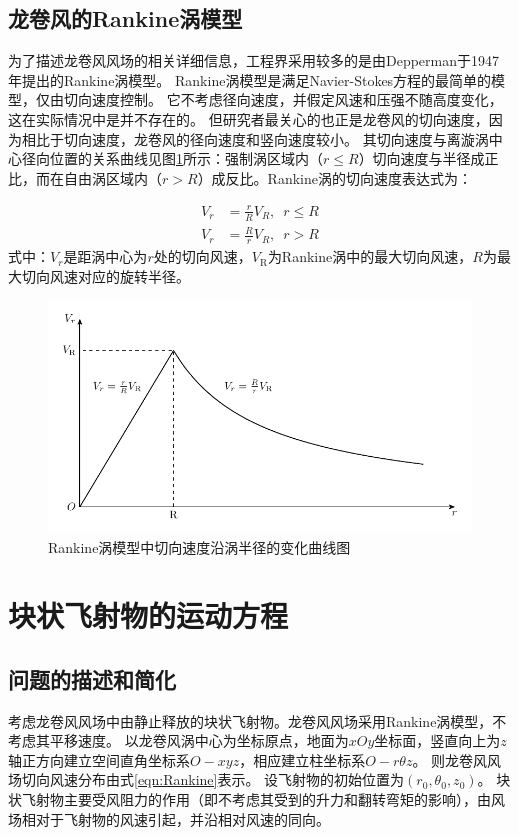 \documentclass{ctexart}
\begin{document}
\subsection{龙卷风的Rankine涡模型}
为了描述龙卷风风场的相关详细信息，工程界采用较多的是由Depperman\cite{Depperman1947}于1947年提出的Rankine涡模型。
Rankine涡模型是满足Navier-Stokes方程的最简单的模型，仅由切向速度控制。
它不考虑径向速度，并假定风速和压强不随高度变化，这在实际情况中是并不存在的。
但研究者最关心的也正是龙卷风的切向速度，因为相比于切向速度，龙卷风的径向速度和竖向速度较小。
其切向速度与离漩涡中心径向位置的关系曲线见图\ref{fig:Rankine}所示：强制涡区域内（$r\leq R$）切向速度与半径成正比，而在自由涡区域内（$r > R$）成反比。Rankine涡的切向速度表达式为\cite{Commission2007}：

\begin{equation}
\label{eqn:Rankine}
\begin{split}
    V_r &= \frac{r}{R} V_R,  \,\,\, r \leq R \\
    V_r &= \frac{R}{r} V_R,  \,\,\, r > R
\end{split}
\end{equation}
式中：$V_r$是距涡中心为$r$处的切向风速，$V_{\mathrm{R}}$为Rankine涡中的最大切向风速，$R$为最大切向风速对应的旋转半径。

\begin{figure}[h]
\centering
\includegraphics{./fig/Rankine}
\caption{Rankine涡模型中切向速度沿涡半径的变化曲线图}
\label{fig:Rankine}
\end{figure}

\section{块状飞射物的运动方程}
\subsection{问题的描述和简化}
考虑龙卷风风场中由静止释放的块状飞射物。龙卷风风场采用Rankine涡模型，不考虑其平移速度。
以龙卷风涡中心为坐标原点，地面为$xOy$坐标面，竖直向上为$z$轴正方向建立空间直角坐标系$O-xyz$，相应建立柱坐标系$O-r\theta z$。
则龙卷风风场切向风速分布由式\eqref{eqn:Rankine}表示。
设飞射物的初始位置为$(r_0,\theta_0,z_0)$。
块状飞射物主要受风阻力的作用（即不考虑其受到的升力和翻转弯矩的影响），由风场相对于飞射物的风速引起，并沿相对风速的同向。
\end{document}
